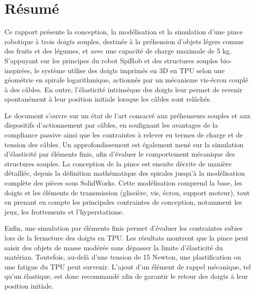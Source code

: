 \documentclass[a4paper, 11pt]{report}
\newcounter{chapcount}
\begin{document}
\setcounter{page}{2}

\clearpage
\section*{Résumé}

Ce rapport présente la conception, la modélisation et la simulation d’une pince robotique à trois doigts souples, destinée à la préhension d’objets légers comme des fruits et des légumes, et avec une capacité de charge maximale de 5 kg. S’appuyant sur les principes du robot SpiRob et des structures souples bio-inspirées, le système utilise des doigts imprimés en 3D en TPU selon une géométrie en spirale logarithmique, actionnés par un mécanisme vis-écrou couplé à des câbles. En outre, l’élasticité intrinsèque des doigts leur permet de revenir spontanément à leur position initiale lorsque les câbles sont relâchés.

Le document s’ouvre sur un état de l’art consacré aux préhenseurs souples et aux dispositifs d’actionnement par câbles, en soulignant les avantages de la compliance passive ainsi que les contraintes à relever en termes de charge et de tension des câbles. Un approfondissement est également mené sur la simulation d’élasticité par éléments finis, afin d’évaluer le comportement mécanique des structures souples. La conception de la pince est ensuite décrite de manière détaillée, depuis la définition mathématique des spirales jusqu’à la modélisation complète des pièces sous SolidWorks. Cette modélisation comprend la base, les doigts et les éléments de transmission (glissière, vis, écrou, support moteur), tout en prenant en compte les principales contraintes de conception, notamment les jeux, les frottements et l’hyperstatisme.

Enfin, une simulation par éléments finis permet d’évaluer les contraintes subies lors de la fermeture des doigts en TPU. Les résultats montrent que la pince peut saisir des objets de masse modérée sans dépasser la limite d’élasticité du matériau. Toutefois, au-delà d’une tension de 15 Newton, une plastification ou une fatigue du TPU peut survenir. L’ajout d’un élément de rappel mécanique, tel qu’un élastique, est donc recommandé afin de garantir le retour des doigts à leur position initiale.

\clearpage
\tableofcontents
\clearpage

\setcounter{chapcount}{0} %
\end{document}
